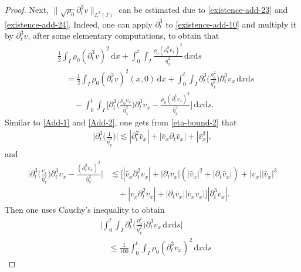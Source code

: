\documentclass[11pt, reqno]{amsart}
\newcommand{\diff}{\mathrm{d}}
\numberwithin{equation}{section}
\begin{document}
{\begin{proof}
\bigskip
{} Next,  \(\|\sqrt{\rho_0}\partial_t^3v\|_{L^2(I)}\) can be estimated due to \eqref{existence-add-23} and \eqref{existence-add-24}. Indeed, one can apply \(\partial_t^3\) to \eqref{existence-add-10} and multiply it by \(\partial_t^3v\), after some elementary computations, to obtain that
\begin{equation}\label{existence-add-26}
\begin{aligned}
&\frac{1}{2}\int_I \rho_0(\partial_t^3v)^2\,\diff x
+\int_0^t\int_I\frac{\rho_0(\partial_t^3v_x)^2}{\bar{\eta}_x^2}\,\diff x\diff s\\
&\quad=\frac{1}{2}\int_I \rho_0(\partial_t^3v)^2(x,0)\,\diff x+\int_0^t\int_I\partial_t^3\bigg({\frac{\rho_0^2}{\bar{\eta}_x^2}}\bigg)\partial_t^3v_x\,\diff x\diff s\\
&\qquad-\int_0^t\int_I\bigg[\partial_t^3\bigg(\frac{\rho_0v_x}{\bar{\eta}_x^2}\bigg)\partial_t^3v_x
-\frac{\rho_0(\partial_t^3v_x)^2}{\bar{\eta}_x^2}\bigg]\,\diff x\diff s.
\end{aligned}
\end{equation}
Similar to \eqref{Add-1} and \eqref{Add-2},  one gets from \eqref{eta-bound-2} that
\begin{equation*}
\begin{aligned}
\bigg|\partial_t^3\bigg(\frac{1}{\bar{\eta}_x^2}\bigg)\bigg|\lesssim |\partial_t^2\bar{v}_x|+|\bar{v}_x\partial_t\bar{v}_x|+|\bar{v}_x^3|,
\end{aligned}
\end{equation*}
and
\begin{equation*}
\begin{aligned}
\bigg|\partial_t^3\bigg(\frac{v_x}{\bar{\eta}_x^2}\bigg)\partial_t^3v_x
-\frac{(\partial_t^3v_x)^2}{\bar{\eta}_x^2}\bigg|
&\lesssim \big[|\bar{v}_x\partial_t^2v_x|+|\partial_tv_x|(|\bar{v}_x|^2+|\partial_t\bar{v}_x|)+|v_x||\bar{v}_x|^3\\
&\quad+|v_x\partial_t^2\bar{v}_x|+|\partial_t\bar{v}_x||\bar{v}_xv_x|\big]|\partial_t^3v_x|.
\end{aligned}
\end{equation*}
Then one uses Cauchy's inequality to obtain
\begin{equation}\label{existence-add-27}
\begin{aligned}
&\bigg|\int_0^t\int_I\partial_t^3\bigg({\frac{\rho_0^2}{\bar{\eta}_x^2}}\bigg)\partial_t^3v_x\,\diff x\diff s\bigg|\\
&\quad\leq \frac{1}{100}\int_0^t\int_I\rho_0(\partial_t^3v_x)^2\,\diff x\diff s

\end{aligned}
\end{equation}
\end{proof}}
\end{document}
